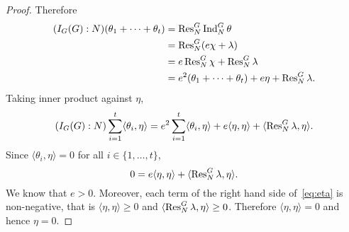 \begin{proof}
    \bigskip 
    Therefore 
    \begin{align*}
        (I_G(G):N)(\theta_1+\cdots+\theta_t)
        &=\operatorname{Res}_N^G\operatorname{Ind}_N^G\theta\\
        &=\operatorname{Res}_N^G(e\chi+\lambda)\\
        &=e\operatorname{Res}_N^G\chi+\operatorname{Res}_N^G\lambda\\
        &=e^2(\theta_1+\cdots+\theta_t)+e\eta+\operatorname{Res}_N^G\lambda.
    \end{align*}
    Taking inner product against $\eta$,  
    \[
    (I_G(G):N)\sum_{i=1}^t\langle\theta_i,\eta\rangle 
    =e^2\sum_{i=1}^t\langle\theta_i,\eta\rangle+e\langle\eta,\eta\rangle+\langle\operatorname{Res}_N^G\lambda,\eta\rangle. 
    \]
    Since $\langle\theta_i,\eta\rangle=0$ for all $i\in\{1,\dots,t\}$, 
    \begin{equation}
    \label{eq:eta}
    0=e\langle\eta,\eta\rangle+\langle\operatorname{Res}_N^G\lambda,\eta\rangle.
    \end{equation}
    We know that $e>0$. Moreover, each term of the right hand side of~\eqref{eq:eta} is non-negative, that is 
    $\langle\eta,\eta\rangle\geq0$ and 
    $\langle\operatorname{Res}_N^G\lambda,\eta\rangle\geq0$. Therefore 
    $\langle\eta,\eta\rangle=0$ and hence $\eta=0$. 
\end{proof}

    

